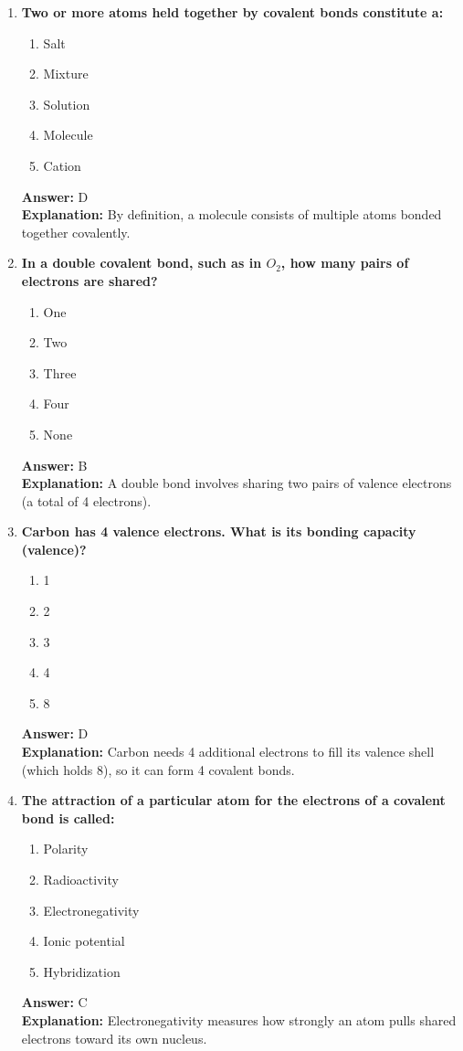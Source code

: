 \documentclass[11pt, a4paper]{article}
\begin{document}
\begin{enumerate}
\item \textbf{Two or more atoms held together by covalent bonds constitute a:}
\begin{enumerate}[label=\Alph*.]
    \item Salt
    \item Mixture
    \item Solution
    \item Molecule
    \item Cation
\end{enumerate}
\textbf{Answer:} D \\
\textbf{Explanation:} By definition, a molecule consists of multiple atoms bonded together covalently.

\item \textbf{In a double covalent bond, such as in $O_2$, how many pairs of electrons are shared?}
\begin{enumerate}[label=\Alph*.]
    \item One
    \item Two
    \item Three
    \item Four
    \item None
\end{enumerate}
\textbf{Answer:} B \\
\textbf{Explanation:} A double bond involves sharing two pairs of valence electrons (a total of 4 electrons).

\item \textbf{Carbon has 4 valence electrons. What is its bonding capacity (valence)?}
\begin{enumerate}[label=\Alph*.]
    \item 1
    \item 2
    \item 3
    \item 4
    \item 8
\end{enumerate}
\textbf{Answer:} D \\
\textbf{Explanation:} Carbon needs 4 additional electrons to fill its valence shell (which holds 8), so it can form 4 covalent bonds.

\item \textbf{The attraction of a particular atom for the electrons of a covalent bond is called:}
\begin{enumerate}[label=\Alph*.]
    \item Polarity
    \item Radioactivity
    \item Electronegativity
    \item Ionic potential
    \item Hybridization
\end{enumerate}
\textbf{Answer:} C \\
\textbf{Explanation:} Electronegativity measures how strongly an atom pulls shared electrons toward its own nucleus.


\end{enumerate}
\end{document}
